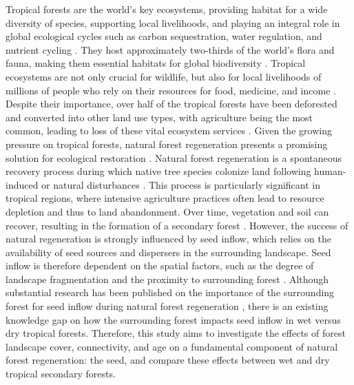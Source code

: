 Tropical forests are the world's key ecosystems, providing habitat for a wide diversity of species, supporting local livelihoods, and playing an integral role in global ecological cycles such as carbon sequestration, water regulation, and nutrient cycling \citep{bormaCarbonContributionsSouth2022}. They host approximately two-thirds of the world's flora and fauna, making them essential habitats for global biodiversity \citep{mulatuBiodiversityMonitoringChanging2017}. Tropical ecosystems are not only crucial for wildlife, but also for local livelihoods of millions of people who rely on their resources for food, medicine, and income \citep{bormaCarbonContributionsSouth2022}. Despite their importance, over half of the tropical forests have been deforested and converted into other land use types, with agriculture being the most common, leading to loss of these vital ecosystem services \citep{chazdonNaturalRegenerationTool2016, arroyo-rodriguezMultipleSuccessionalPathways2017}. Given the growing pressure on tropical forests, natural forest regeneration presents a promising solution for ecological restoration \citep{hordijkLandUseHistory2024}. Natural forest regeneration is a spontaneous recovery process during which native tree species colonize land following human-induced or natural disturbances \citep{crouzeillesEcologicalRestorationSuccess2017}. This process is particularly significant in tropical regions, where intensive agriculture practices often lead to resource depletion and thus to land abandonment. Over time, vegetation and soil can recover, resulting in the formation of a secondary forest \citep{chazdonSecondGrowthPromise2014}. However, the success of natural regeneration is strongly influenced by seed inflow, which relies on the availability of seed sources and dispersers in the surrounding landscape. Seed inflow is therefore dependent on the spatial factors, such as the degree of landscape fragmentation and the proximity to surrounding forest \citep{arroyo-rodriguezMultipleSuccessionalPathways2017}. Although substantial research has been published on the importance of the surrounding forest for seed inflow during natural forest regeneration \citep{dentUnitingNicheDifferentiation2021, arroyo-rodriguezMultipleSuccessionalPathways2017, v.h.safarLandscapeOpennessHas2022}, there is an existing knowledge gap on how the surrounding forest impacts seed inflow in wet versus dry tropical forests. Therefore, this study aims to investigate the effects of forest landscape cover, connectivity, and age on a fundamental component of natural forest regeneration: the seed, and compare these effects between wet and dry tropical secondary forests.

